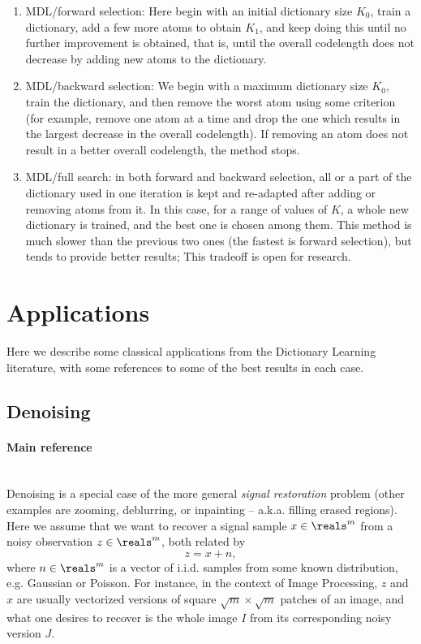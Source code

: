 \documentclass[a4paper,11pt]{article}
\begin{document}
\begin{enumerate}
\item MDL/forward selection:  Here begin with an initial dictionary size $K_0$, train a dictionary, add a few more atoms to obtain $K_1$, and keep doing this until no further improvement is obtained, that is, until the overall codelength does not decrease by adding new atoms to the dictionary.
 
\item MDL/backward selection: We begin with a maximum dictionary size $K_0$, train the dictionary, and then remove the worst atom using some criterion (for example, remove one atom at a time and drop the one  which results in the largest decrease in the overall codelength). If removing an atom does not result in a better overall codelength, the method stops. 

\item MDL/full search: in both forward and backward selection, all or a part of the dictionary used in one iteration is kept and re-adapted after adding or removing atoms from it. In this case, for a range of values of $K$, a whole new dictionary is trained, and the best one is chosen among them. This method is much slower than the previous two ones (the fastest is forward selection), but tends to provide better results; This tradeoff is open for research.

\end{enumerate}


\section{Applications}

Here we describe some classical applications from the Dictionary Learning literature, with some references to some of the best results in each case.

\subsection{Denoising}

\paragraph{Main reference} \cite{ksvd}\\

Denoising is a special case of the more general \emph{signal restoration} problem (other examples are zooming, deblurring, or inpainting -- a.k.a. filling erased regions). Here we assume that we want to recover a signal sample $x \in \reals^{m}$ from a noisy observation $z \in \reals^{m}$, both related by
\[
z = x + n,
\]
where $n \in \reals^m$ is a vector of i.i.d. samples from some known distribution, e.g. Gaussian or Poisson. For instance, in the context of Image Processing, $z$ and $x$ are usually vectorized versions of square $\sqrt{m}\times\sqrt{m}$ patches of an image, and what one desires to recover is the whole image $I$ from its corresponding noisy version $J$.
\end{document}
